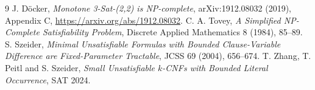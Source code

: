 \documentclass[11pt]{article}
\begin{document}
\begin{thebibliography}{9}
 J. D\"ocker, \emph{Monotone 3-Sat-(2,2) is NP-complete}, arXiv:1912.08032 (2019), Appendix C, \url{https://arxiv.org/abs/1912.08032}.
 C. A. Tovey, \emph{A Simplified NP-Complete Satisfiability Problem}, Discrete Applied Mathematics 8 (1984), 85--89.
 S. Szeider, \emph{Minimal Unsatisfiable Formulas with Bounded Clause-Variable Difference are Fixed-Parameter Tractable}, JCSS 69 (2004), 656--674.
 T. Zhang, T. Peitl and S. Szeider, \emph{Small Unsatisfiable $k$-CNFs with Bounded Literal Occurrence}, SAT 2024.
\end{thebibliography}
\end{document}
